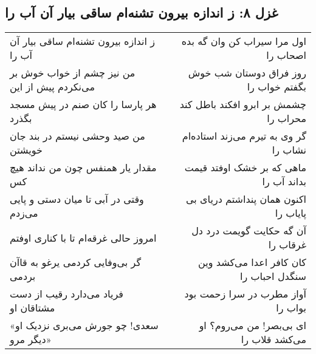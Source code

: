 \begin{center}
\section*{غزل ۸: ز اندازه بیرون تشنه‌ام ساقی بیار آن آب را}
\label{sec:008}
\begin{longtable}{l p{0.5cm} r}
ز اندازه بیرون تشنه‌ام ساقی بیار آن آب را
&&
اول مرا سیراب کن وان گه بده اصحاب را
\\
من نیز چشم از خواب خوش بر می‌نکردم پیش از این
&&
روز فراق دوستان شب خوش بگفتم خواب را
\\
هر پارسا را کان صنم در پیش مسجد بگذرد
&&
چشمش بر ابرو افکند باطل کند محراب را
\\
من صید وحشی نیستم در بند جان خویشتن
&&
گر وی به تیرم می‌زند استاده‌ام نشاب را
\\
مقدار یار همنفس چون من نداند هیچ کس
&&
ماهی که بر خشک اوفتد قیمت بداند آب را
\\
وقتی در آبی تا میان دستی و پایی می‌زدم
&&
اکنون همان پنداشتم دریای بی پایاب را
\\
امروز حالی غرقه‌ام تا با کناری اوفتم
&&
آن گه حکایت گویمت درد دل غرقاب را
\\
گر بی‌وفایی کردمی یرغو به قاآن بردمی
&&
کان کافر اعدا می‌کشد وین سنگدل احباب را
\\
فریاد می‌دارد رقیب از دست مشتاقان او
&&
آواز مطرب در سرا زحمت بود بواب را
\\
«سعدی! چو جورش می‌بری نزدیک او دیگر مرو»
&&
ای بی‌بصر! من می‌روم؟ او می‌کشد قلاب را
\\
\end{longtable}
\end{center}
